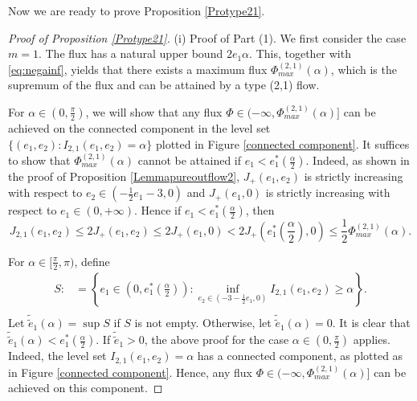 \documentclass[reqno,12pt]{amsart}
\begin{document}
{ 



Now we are ready to prove Proposition \ref{Protype21}.
  \begin{proof}[Proof of Proposition \ref{Protype21}] 
  (i) Proof of Part (1). 
  We first consider the case  $m=1$. The flux has a natural upper bound $2e_1 \alpha $. This, together with \eqref{eq:negainf}, yields that there exists a maximum flux $\Phi_{max}^{(2,1)}(\alpha)$, which is the supremum of the flux and can be attained by a type (2,1) flow. 
  
  For $\alpha\in (0, \frac{\pi}{2})$, we will show that any flux $\Phi \in (-\infty, \Phi_{max}^{(2,1)}(\alpha)]$ can be achieved on the connected component in the level set $\{(e_1,e_2): I_{2,1}(e_1,e_2)=\alpha\}$ plotted in Figure \ref{connected component}. It suffices to show that $\Phi_{max}^{(2,1)}(\alpha)$ cannot be attained if $e_1<e_1^*(\frac{\alpha}{2})$. Indeed, as shown in the proof of Proposition \ref{Lemmapureoutflow2}, $J_+(e_1,e_2)$ is strictly increasing with respect to $e_2\in (-\frac{1}{2}e_1 -3,0)$ and $J_+(e_1,0)$ is strictly increasing with respect to $e_1 \in (0,+\infty)$. Hence if $e_1<e_1^*(\frac{\alpha}{2})$, then 
  \begin{equation*}
      J_{2,1}(e_1,e_2)\leq 2J_+(e_1,e_2)\leq 2J_+(e_1,0)<2J_+\left(e_1^*\left(\frac{\alpha}{2}\right),0\right) \leq \frac12 \Phi_{max}^{(2,1)}(\alpha).
  \end{equation*}
 
  


  
  


For $\alpha \in [\frac{\pi}{2}, \pi)$, define 
    \begin{equation*}
    \begin{aligned}
          S:& =\left\{e_1\in \left(0,e_1^*\left(\frac{\alpha}{2}\right)\right): \inf_{e_2\in(-3-\frac{1}{2}e_1,0)}I_{2,1}(e_1,e_2) \geq \alpha\right\}. \\
    \end{aligned}     
    \end{equation*}
    Let $\tilde{\tilde{e}}_1 (\alpha) = \sup S$ if $S$ is not empty. Otherwise, let $\tilde{\tilde{e}}_1(\alpha)=0$. 
    It is clear that $\tilde{\tilde{e}}_1(\alpha)<e_1^*\left(\frac{\alpha}{2}\right)$.
         If  $ \tilde{\tilde{e}}_1>0$, the above proof  for the case $\alpha \in (0,  \frac{\pi}{2})$ applies. Indeed, the level set  $I_{2,1}(e_1,e_2)=\alpha$ has a connected component, as plotted as in Figure \ref{connected component}. Hence, any flux $\Phi \in (-\infty, \Phi_{max}^{(2,1)}(\alpha)]$ can be achieved on this component.
      

\end{proof}}
\end{document}
